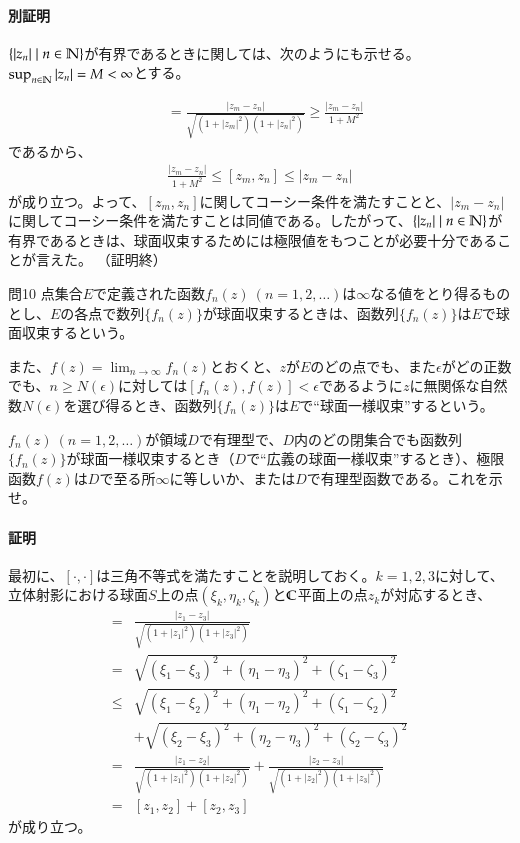 \paragraph{別証明}
$\{|z_n|\mid n\in\mathbb{N}\}$が有界であるときに関しては、次のようにも示せる。$\sup_{n\in\mathbb{N}}|z_n|=M<\infty$とする。

\begin{align*}
    [z_m,z_n]
    &=\frac{|z_m-z_n|}{\sqrt{(1+|z_m|^2)(1+|z_n|^2)}}
    \ge\frac{|z_m-z_n|}{1+M^2}
\end{align*}
であるから、
\begin{align*}
    \frac{|z_m-z_n|}{1+M^2}
    \le[z_m,z_n]
    \le|z_m-z_n|
\end{align*}
が成り立つ。よって、$[z_m,z_n]$に関してコーシー条件を満たすことと、$|z_m-z_n|$に関してコーシー条件を満たすことは同値である。したがって、$\{|z_n|\mid n\in\mathbb{N}\}$が有界であるときは、球面収束するためには極限値をもつことが必要十分であることが言えた。
（証明終）

\newpage
\begin{mysimplebox}{問10}
    点集合$E$で定義された函数$f_n(z)\ (n=1,2,\dots)$は$\infty$なる値をとり得るものとし、$E$の各点で数列$\{f_n(z)\}$が球面収束するときは、函数列$\{f_n(z)\}$は$E$で球面収束するという。

    また、$f(z)=\lim_{n\to\infty}f_n(z)$とおくと、$z$が$E$のどの点でも、また$\epsilon$がどの正数でも、$n\ge N(\epsilon)$に対しては$[f_n(z),f(z)]<\epsilon$であるように$z$に無関係な自然数$N(\epsilon)$を選び得るとき、函数列$\{f_n(z)\}$は$E$で``球面一様収束''するという。

    $f_n(z)\ (n=1,2,\dots)$が領域$D$で有理型で、$D$内のどの閉集合でも函数列$\{f_n(z)\}$が球面一様収束するとき（$D$で``広義の球面一様収束''するとき）、極限函数$f(z)$は$D$で至る所$\infty$に等しいか、または$D$で有理型函数である。これを示せ。
\end{mysimplebox}
\paragraph{証明}
最初に、$[\cdot,\cdot]$は三角不等式を満たすことを説明しておく。$k=1,2,3$に対して、立体射影における球面$S$上の点$(\xi_k,\eta_k,\zeta_k)$と$\mathbb{C}$平面上の点$z_k$が対応するとき、
\begin{align*}
    [z_1,z_3]
    =&\frac{|z_1-z_3|}{\sqrt{(1+|z_1|^2)(1+|z_3|^2)}}\\
    =&\sqrt{(\xi_1-\xi_3)^2+(\eta_1-\eta_3)^2+(\zeta_1-\zeta_3)^2}\\
    \le&\sqrt{(\xi_1-\xi_2)^2+(\eta_1-\eta_2)^2+(\zeta_1-\zeta_2)^2}\\
    &+\sqrt{(\xi_2-\xi_3)^2+(\eta_2-\eta_3)^2+(\zeta_2-\zeta_3)^2}\\
    =&\frac{|z_1-z_2|}{\sqrt{(1+|z_1|^2)(1+|z_2|^2)}}+\frac{|z_2-z_3|}{\sqrt{(1+|z_2|^2)(1+|z_3|^2)}}\\
    =&[z_1,z_2]+[z_2,z_3]
\end{align*}
が成り立つ。

